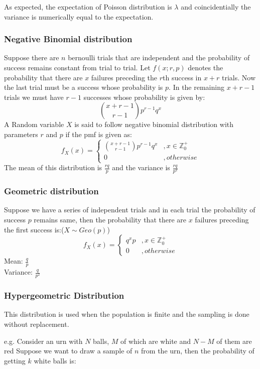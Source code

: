 \documentclass[11pt,letterpaper]{article}
\begin{document}
\noindent As expected, the expectation of Poisson distribution is $\lambda$ and coincidentially
the variance is numerically equal to the expectation. 
\subsubsection{Negative Binomial distribution}
Suppose there are $n$ bernoulli trials that are independent and the probability of
success remains constant from trial to trial. Let $f(x;r,p)$ denotes the probability
that there are $x$ failures preceding the $r$th success in $x+r$ trials. Now the
last trial must be a success whose probability is $p$. In the remaining $x+r-1$
trials we must have $r-1$ successes whose probability is given by:
\[
  {x+r-1 \choose r-1} p^{r-1} q^{x}
\]
A Random variable $X$ is said to follow negative binomial distribution with parameters 
$r$ and $p$ if the pmf is given as:
\[
  f_X(x) = \begin{cases}  {x+r-1 \choose r-1} p^{r-1} q^{x} &, x \in \mathbb{Z}^+_0 \\ 
  0 &, otherwise \end{cases}
\]
The mean of this distribution is $\frac{rq}{p}$ and the variance is $\frac{rq}{p^2}$

\subsubsection{Geometric distribution}
Suppose we have a series of independent trials and in each trial the probability
of success $p$ remains same, then the probability that there are $x$ failures
preceding the first success is:($X \sim Geo(p)$)
\[
  f_X(x) = \begin{cases} q^xp &, x \in \mathbb{Z}^+_0 \\ 
  0 &, otherwise\end{cases}
\]
Mean: $\frac{q}{p}$\\
Variance: $\frac{q}{p^2}$

\subsubsection{Hypergeometric Distribution}
This distribution is used when the population is finite and the sampling is done 
without replacement. 

e.g. Consider an urn with $N$ balls, $M$ of which are white and $N-M$ of them are red
Suppose we want to draw a sample of $n$ from the urn, then the probability of getting $k$ white 
balls is:
\end{document}
